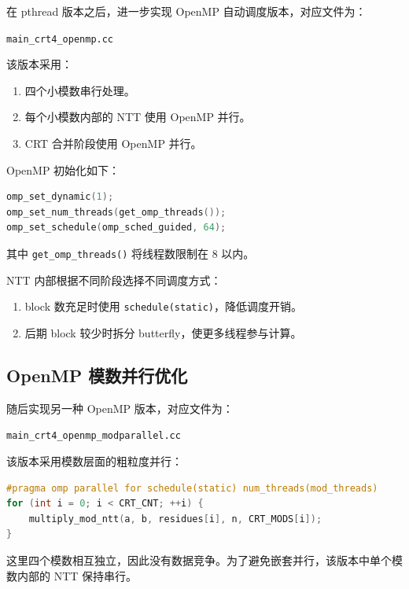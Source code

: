 \documentclass[UTF8,a4paper,12pt]{ctexart}
\begin{document}
在 pthread 版本之后，进一步实现 OpenMP 自动调度版本，对应文件为：

\begin{center}
\texttt{main\_crt4\_openmp.cc}
\end{center}

该版本采用：

\begin{enumerate}
  \item 四个小模数串行处理。
  \item 每个小模数内部的 NTT 使用 OpenMP 并行。
  \item CRT 合并阶段使用 OpenMP 并行。
\end{enumerate}

OpenMP 初始化如下：

\begin{lstlisting}[language=C++]
omp_set_dynamic(1);
omp_set_num_threads(get_omp_threads());
omp_set_schedule(omp_sched_guided, 64);
\end{lstlisting}

其中 \texttt{get\_omp\_threads()} 将线程数限制在 8 以内。

NTT 内部根据不同阶段选择不同调度方式：

\begin{enumerate}
  \item block 数充足时使用 \texttt{schedule(static)}，降低调度开销。
  \item 后期 block 较少时拆分 butterfly，使更多线程参与计算。
\end{enumerate}

\subsection{OpenMP 模数并行优化}

随后实现另一种 OpenMP 版本，对应文件为：

\begin{center}
\texttt{main\_crt4\_openmp\_modparallel.cc}
\end{center}

该版本采用模数层面的粗粒度并行：

\begin{lstlisting}[language=C++]
#pragma omp parallel for schedule(static) num_threads(mod_threads)
for (int i = 0; i < CRT_CNT; ++i) {
    multiply_mod_ntt(a, b, residues[i], n, CRT_MODS[i]);
}
\end{lstlisting}

这里四个模数相互独立，因此没有数据竞争。为了避免嵌套并行，该版本中单个模数内部的 NTT 保持串行。
\end{document}
